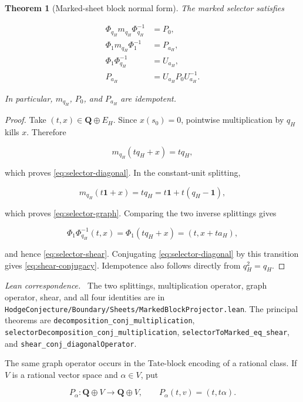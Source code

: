 \documentclass[11pt]{article}
\newtheorem{theorem}{Theorem}[section]
\theoremstyle{definition}
\theoremstyle{remark}
\newcommand{\Q}{\mathbf Q}
\newcommand{\one}{\mathbf 1}
\newcommand{\leanpath}[1]{\texttt{\nolinkurl{#1}}}
\newcommand{\sheetsrc}[1]{%
  \leanpath{HodgeConjecture/Boundary/Sheets/#1}}
\newenvironment{leanfiles}
  {\par\medskip\begingroup\footnotesize\raggedright\noindent
   \textit{Lean correspondence.}\ }
  {\par\endgroup\medskip}
\begin{document}
\begin{theorem}[Marked-sheet block normal form]
\label{thm:marked-block}
The marked selector satisfies

\begin{align}
  \Phi_{q_H}m_{q_H}\Phi_{q_H}^{-1}&=P_0,\label{eq:selector-diagonal}\\
  \Phi_1m_{q_H}\Phi_1^{-1}&=P_{a_H},\label{eq:selector-graph}\\
  \Phi_1\Phi_{q_H}^{-1}&=U_{a_H},\label{eq:selector-shear}\\
  P_{a_H}&=U_{a_H}P_0U_{a_H}^{-1}.\label{eq:shear-conjugacy}
\end{align}

In particular, \(m_{q_H}\), \(P_0\), and \(P_{a_H}\) are idempotent.
\end{theorem}

\begin{proof}
Take \((t,x)\in\Q\oplus E_H\).  Since \(x(s_0)=0\), pointwise multiplication
by \(q_H\) kills \(x\).  Therefore

\[
  m_{q_H}(tq_H+x)=tq_H,
\]

which proves \eqref{eq:selector-diagonal}.  In the constant-unit splitting,

\[
  m_{q_H}(t\one+x)=tq_H
  =t\one+t(q_H-\one),
\]

which proves \eqref{eq:selector-graph}.  Comparing the two inverse splittings
gives

\[
  \Phi_1\Phi_{q_H}^{-1}(t,x)
  =\Phi_1(tq_H+x)=(t,x+ta_H),
\]

and hence \eqref{eq:selector-shear}.  Conjugating
\eqref{eq:selector-diagonal} by this transition gives
\eqref{eq:shear-conjugacy}.  Idempotence also follows directly from
\(q_H^2=q_H\).
\end{proof}

\begin{leanfiles}
The two splittings, multiplication operator, graph operator, shear, and all
four identities are in \sheetsrc{MarkedBlockProjector.lean}.  The principal
theorems are \leanpath{decomposition_conj_multiplication},
\leanpath{selectorDecomposition_conj_multiplication},
\leanpath{selectorToMarked_eq_shear}, and
\leanpath{shear_conj_diagonalOperator}.
\end{leanfiles}

The same graph operator occurs in the Tate-block encoding of a rational
class.  If \(V\) is a rational vector space and \(\alpha\in V\), put

\[
  P_\alpha:\Q\oplus V\longrightarrow\Q\oplus V,
  \qquad
  P_\alpha(t,v)=(t,t\alpha).
\]
\end{document}
